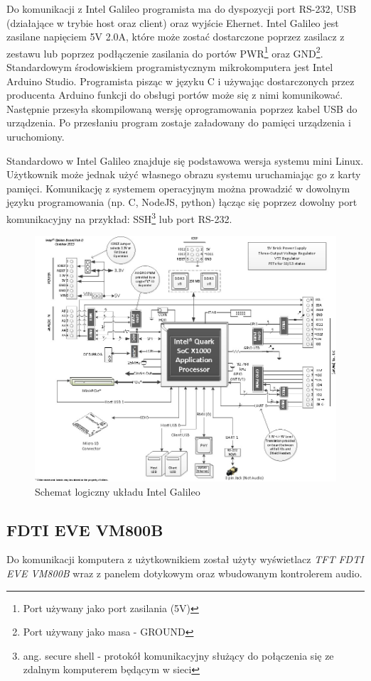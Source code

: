 \documentclass{xmgr}
\begin{document}
Do komunikacji z Intel Galileo programista ma do dyspozycji port RS-232, USB (działające w trybie host oraz client) oraz wyjście Ehernet. Intel Galileo jest zasilane napięciem 5V 2.0A, które może zostać dostarczone poprzez zasilacz z zestawu lub poprzez podłączenie zasilania do portów PWR\footnote{Port używany jako port zasilania (5V)} oraz GND\footnote{Port używany jako masa - GROUND}. Standardowym środowiskiem programistycznym mikrokomputera jest Intel Arduino Studio. Programista pisząc w języku C i używając dostarczonych przez producenta Arduino funkcji do obsługi portów może się z nimi komunikować. Następnie przesyła skompilowaną wersję oprogramowania poprzez kabel USB do urządzenia. Po przesłaniu program zostaje załadowany do pamięci urządzenia i uruchomiony. 

Standardowo w Intel Galileo znajduje się podstawowa wersja systemu mini Linux. Użytkownik może jednak użyć własnego obrazu systemu uruchamiając go z karty pamięci. Komunikację z systemem operacyjnym można prowadzić w dowolnym języku programowania (np. C, NodeJS, python) łącząc się poprzez dowolny port komunikacyjny na przykład: SSH\footnote{ang. secure shell - protokół komunikacyjny służący do połączenia się ze zdalnym komputerem będącym w sieci} lub port RS-232.

\begin{figure}[!h]
    \centering
    \includegraphics[height=0.6\textwidth]{images/IntelGalileoLogicSchematics.jpg}
    \caption{Schemat logiczny układu Intel Galileo\label{IntelGalileoLogicSchematics}}
\end{figure}

\subsection{FDTI EVE VM800B}
Do komunikacji komputera z użytkownikiem został użyty wyświetlacz \emph{TFT FDTI EVE VM800B} wraz z panelem dotykowym oraz wbudowanym kontrolerem audio. 
\end{document}
